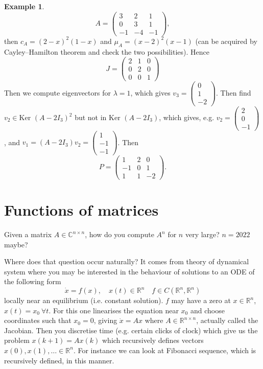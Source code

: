 \documentclass[a4paper]{article}
\newcommand{\Ker}{\text{Ker }}
\theoremstyle{definition}
\newtheorem{example}[defn]{Example}
\begin{document}
\begin{example}
\[
A=\begin{pmatrix}
3&2&1\\0&3&1\\-1&-4&-1
\end{pmatrix},
\]
then $c_{A}=(2-x)^2(1-x)$ and $\mu_{A}=(x-2)^2 (x-1)$ (can be acquired by Cayley–Hamilton theorem and check the two possibilities). Hence
\[
J=\begin{pmatrix}
2&1&0\\0&2&0\\0&0&1
\end{pmatrix}
\]
Then we compute eigenvectors for $\lambda=1$, which gives $v_3=\begin{pmatrix}0\\1\\-2\end{pmatrix}$. Then find $v_2\in \Ker (A-2I_3)^2$ but not in $\Ker (A-2I_3)$, which gives, e.g. $v_2=\begin{pmatrix}2\\0\\-1\end{pmatrix}$, and $v_1=(A-2I_3)v_2=\begin{pmatrix}1\\-1\\-1\end{pmatrix}$. Then
\[
P=\begin{pmatrix}
1&2&0\\-1&0&1\\1&1&-2
\end{pmatrix} .
\]
\end{example}

\section{Functions of matrices}
Given a matrix $A\in \mathbb C^{n\times n}$, how do you compute $A^n$ for $n$ very large? $n=2022$ maybe?

Where does that question occur naturally? It comes from theory of dynamical system where you may be interested in the behaviour of solutions to an ODE of the following form
\[
\dot x = f(x), \quad x(t) \in \mathbb R^n \quad f\in C (\mathbb R^n,\mathbb R^n)
\]
locally near an equilibrium (i.e. constant solution). $f$ may have a zero at $x\in \mathbb R^n$, $x(t)=x_0\ \forall t$. For this one linearises the equation near $x_0$ and choose coordinates such that $x_0=0$, giving $\dot x = Ax$ where $A\in \mathbb R^{n\times n}$, actually called the Jacobian. Then you discretise time (e.g. certain clicks of clock) which give us the problem $x(k+1)=Ax(k)$ which recursively defines vectors $x(0),x(1),\ldots \in \mathbb R^n$. For instance we can look at Fibonacci sequence, which is recursively defined, in this manner.
\end{document}
